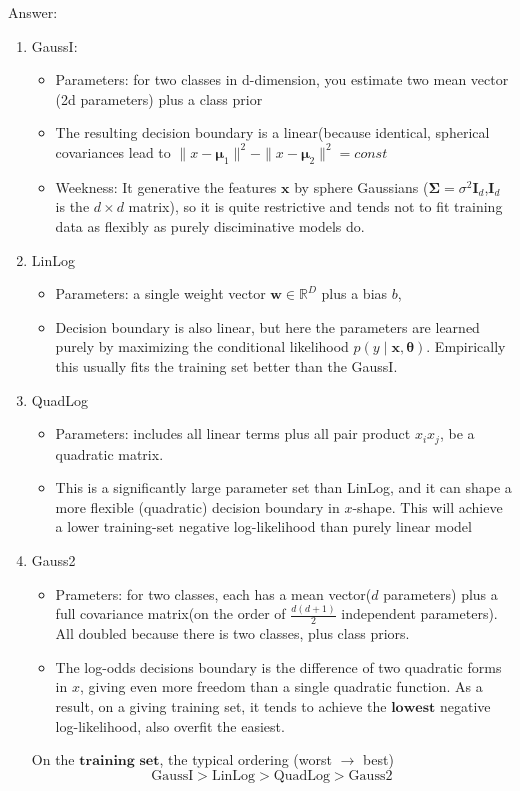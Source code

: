 \documentclass[10pt,landscape]{article}
\newcommand{\inp}{\textbf{x}}
\newcommand{\parameter}{\boldsymbol{\theta}}
\newcommand{\R}{\mathbb{R}}
\newcommand{\variance}{\sigma^2}
\newcommand{\Cov}{\mathbf{\Sigma}}
\newcommand{\Mean}{\boldsymbol{\mu}}
\newcommand{\Weight}{\mathbf{w}}
\newcommand{\identity}{\mathbf{I}}
\begin{document}
\begin{multicols*}{3}
Answer: 
\begin{enumerate}
    \item GaussI:
    \begin{itemize}
        \item Parameters: for two classes in d-dimension, you estimate two mean vector (2d parameters) plus a class prior
        \item The resulting decision boundary is a linear(because identical, spherical covariances lead to $\|x-\Mean_1\|^2-\|x-\Mean_2\|^2=const$
        \item Weekness: It generative the features $\inp$ by sphere Gaussians ($\Cov=\variance\identity_d$,$\identity_d$ is the $d\times d$ matrix), so it is quite restrictive and tends not to fit training data as flexibly as purely disciminative models do.
    \end{itemize}
    \item LinLog
    \begin{itemize}
        \item Parameters: a single weight vector $\Weight\in\R^D$ plus a bias $b$, 
        \item Decision boundary is also linear, but here the parameters are learned purely by maximizing the conditional likelihood $p(y\mid \inp,\parameter)$. Empirically this usually fits the training set better than the GaussI.
    \end{itemize}
    \item QuadLog
    \begin{itemize}
        \item Parameters: includes all linear terms plus all pair product $x_ix_j$, be a quadratic matrix.
        \item This is a significantly large parameter set than LinLog, and it can shape a more flexible (quadratic) decision boundary in $x$-shape. This will achieve a lower training-set negative log-likelihood than purely linear model
    \end{itemize}
    \item Gauss2
    \begin{itemize}
        \item Prameters: for two classes, each has a mean vector($d$ parameters) plus a full covariance matrix(on the order of $\frac{d(d+1)}{2}$ independent parameters). All doubled because there is two classes, plus class priors.
        \item The log-odds decisions boundary is the difference of two quadratic forms in $x$, giving even more freedom than a single quadratic function. As a result, on a giving training set, it tends to achieve the $\textbf{lowest}$ negative log-likelihood, also overfit the easiest.
    \end{itemize}
    On the $\textbf{training set}$, the typical ordering (worst $\rightarrow$ best)
    \[
        \text{GaussI} > \text{LinLog} > \text{QuadLog} > \text{Gauss2}
    \]
\end{enumerate}
    

\end{multicols*}
\end{document}
